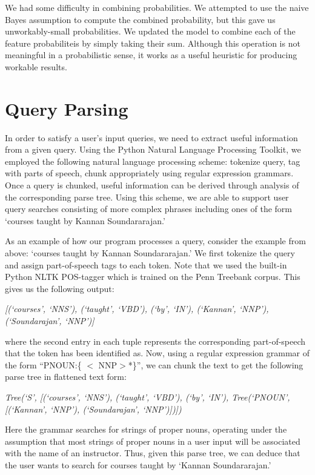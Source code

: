 \documentclass[12pt]{article}
\begin{document}
We had some difficulty in combining probabilities. We attempted to use
the naive Bayes assumption to compute the combined probability, but
this gave us unworkably-small probabilities. We updated the model to
combine each of the feature probabiliteis by simply taking their
sum. Although this operation is not meaningful in a probabilistic
sense, it works as a useful heuristic for producing workable results.

\section*{Query Parsing}
In order to satisfy a user's input queries, we need to extract useful
information from a given query. Using the Python Natural Language
Processing Toolkit, we employed the following natural language
processing scheme: tokenize query, tag with parts of speech, chunk
appropriately using regular expression grammars. Once a query is
chunked, useful information can be derived through analysis of the
corresponding parse tree. Using this scheme, we are able to support
user query searches consisting of more complex phrases including ones of the form 
`courses taught by Kannan Soundararajan.'

As an example of how our program processes a query, consider the example from above:
`courses taught by Kannan Soundararajan.' We first tokenize the query and assign part-of-speech
tags to each token. Note that we used the built-in Python NLTK POS-tagger
which is trained on the Penn Treebank corpus. This gives us the following output: \vspace{0.15in}

\emph{\small{[(`courses', `NNS'), (`taught', `VBD'), (`by', `IN'), (`Kannan', `NNP'), (`Soundarajan', `NNP')]}}	 \vspace{0.15in}

where the second entry in each tuple represents the corresponding part-of-speech that the token has been identified as. Now, using a regular expression grammar of the form ``PNOUN:\{ $<$ NNP$>$*\}'', we can chunk the text to get the following parse tree in flattened text form: \vspace{0.15in}

\emph{\small{Tree(`S', [(`courses', `NNS'), (`taught', `VBD'), (`by', `IN'), Tree(`PNOUN', [(`Kannan', `NNP'), (`Soundarajan', `NNP')])])
}} \vspace{0.15in}

Here the grammar searches for strings of proper nouns, operating under the assumption that most strings of proper nouns in a user input will be associated with the name of an instructor. Thus, given this parse tree, we can deduce that the user wants to search for courses taught by `Kannan Soundararajan.'
\end{document}
